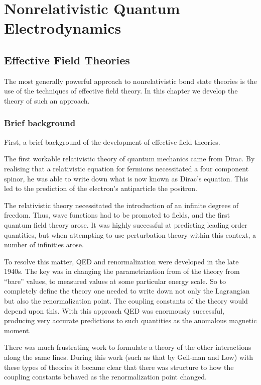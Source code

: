 \chapter{Nonrelativistic Quantum Electrodynamics}

\section{Effective Field Theories}
The most generally powerful approach to nonrelativistic bond state theories is the use of the techniques of effective field theory.  In this chapter we develop the theory of such an approach.


\subsection{Brief background}
First, a brief background of the development of effective field theories.

The first workable relativistic theory of quantum mechanics came from Dirac.  By realising that a relativistic equation for fermions necessitated a four component spinor, he was able to write down what is now known as Dirac's equation.  This led to the prediction of the electron's antiparticle the positron.

The relativistic theory necessitated the introduction of an infinite degrees of freedom.  Thus, wave functions had to be promoted to fields, and the first quantum field theory arose.  It was highly successful at predicting leading order quantities, but when attempting to use perturbation theory within this context, a number of infinities arose.

To resolve this matter, QED and renormalization were developed in the late 1940s.  The key was in changing the parametrization from of the theory from ``bare'' values, to measured values at some particular energy scale.  So to completely define the theory one needed to write down not only the Lagrangian but also the renormalization point.  The coupling constants of the theory would depend upon this.  With this approach QED was enormously successful, producing very accurate predictions to such quantities as the anomalous magnetic moment.

There was much frustrating work to formulate a theory of the other interactions along the same lines.  During this work (such as that by Gell-man and Low) with these types of theories it became clear that there was structure to how the coupling constants behaved as the renormalization point changed.

